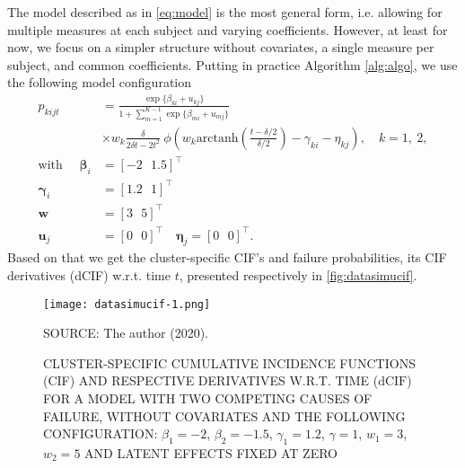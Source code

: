 The model described as in \autoref{eq:model} is the most general form,
i.e. allowing for multiple measures at each subject and varying
coefficients. However, at least for now, we focus on a simpler structure
without covariates, a single measure per subject, and common
coefficients. Putting in practice Algorithm \autoref{alg:algo}, we use
the following model configuration
\begin{align}
  p_{kijt}
  &= \frac{\exp\{\beta_{ki} + u_{kj}\}}{
    1 + \sum_{m=1}^{K-1}\exp\{\beta_{mi} + u_{mj}\}}\nonumber\\
  &\times w_{k}\frac{\delta}{2\delta t - 2t^{2}}~
    \phi\left(
    w_{k}
    \text{arctanh}\left(\frac{t-\delta/2}{\delta/2}\right)
    - \gamma_{ki} - \eta_{kj}
    \right),\quad k = 1,~2,\nonumber\\
  \text{with }\quad
  \bm{\beta}_{i} &= [-2~~~1.5]^{\top}\nonumber\\
  \bm{\gamma}_{i} &= [1.2~~~1]^{\top}\label{eq:modelconfig}\\
  \bm{w} &= [3~~~5]^{\top}\nonumber\\
  \bm{u}_{j} &= [0~~~0]^{\top}\quad
               \bm{\eta}_{j} = [0~~~0]^{\top}\nonumber.
\end{align}
Based on that we get the cluster-specific CIF's and failure
probabilities, its CIF derivatives (dCIF) w.r.t. time \(t\), presented
respectively in \autoref{fig:datasimucif}.

\begin{figure}[H]
  \setlength{\abovecaptionskip}{.0001pt}
  \caption{CLUSTER-SPECIFIC CUMULATIVE INCIDENCE FUNCTIONS (CIF) AND
    RESPECTIVE DERIVATIVES W.R.T. TIME (\(\text{dCIF}\)) FOR A MODEL
    WITH TWO COMPETING CAUSES OF FAILURE, WITHOUT COVARIATES AND THE
    FOLLOWING CONFIGURATION: \(\beta_{1} = -2\), \(\beta_{2} = -1.5\),
    \(\gamma_{1} = 1.2\), \(\gamma = 1\), \(w_{1} = 3\), \(w_{2} = 5\)
    AND LATENT EFFECTS FIXED AT ZERO}
  \vspace{0.2cm} \centering
  \texttt{[image: datasimucif-1.png]}
  \\
  \begin{footnotesize}
    SOURCE: The author (2020).
  \end{footnotesize}
  \label{fig:datasimucif}
\end{figure}

